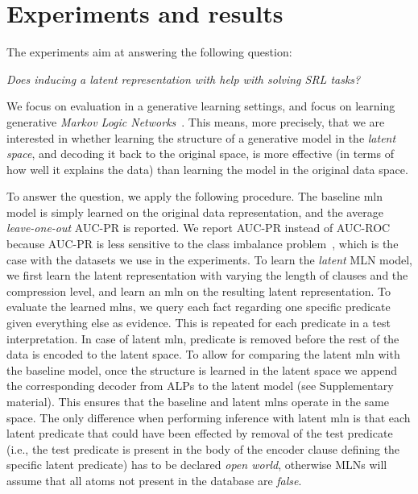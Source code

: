 \section{Experiments and results}



The experiments aim at answering the following question:

\begin{displayquote}
\textit{Does inducing a latent  representation with  help with solving SRL tasks?}
\end{displayquote}

We focus on evaluation in a generative learning settings, and focus on learning generative \textit{Markov Logic Networks}~\cite{Richardson2006}.
This means, more precisely, that we are interested in whether learning the structure of a generative model in the \textit{latent space}, and decoding it back to the original space, is more effective (in terms of how well it explains the data) than learning the model in the original data space.


To answer the question, we apply the following procedure.
The baseline \gls{mln} model is simply learned on the original data representation, and the average \textit{leave-one-out} AUC-PR is reported.
We report AUC-PR instead of AUC-ROC because AUC-PR is less sensitive to the class imbalance problem~\cite{Davis:2006:RPR:1143844.1143874}, which is the case with the datasets we use in the experiments.
To learn the \textit{latent} MLN model, we first learn the latent representation with  varying the length of clauses and the compression level, and learn an \gls{mln} on the resulting latent representation.
To evaluate the learned \gls{mln}s, we query each fact regarding one specific predicate given everything else as evidence.
This is repeated for each predicate in a test interpretation.
In case of latent \gls{mln}, predicate is removed before the rest of the data is encoded to the latent space.
To allow for comparing the latent \gls{mln} with the baseline model, once the structure is learned in the latent space we append the corresponding decoder from ALPs to the latent model (see Supplementary material).
This ensures that the baseline and latent \gls{mln}s operate in the same space.
The only difference when performing inference with latent \gls{mln} is that each latent predicate that could have been effected by removal of the test predicate (i.e., the test predicate is present in the body of the encoder clause defining the specific latent predicate) has to be declared \textit{open world}, otherwise MLNs will assume that all atoms not present in the database are \textit{false}.


